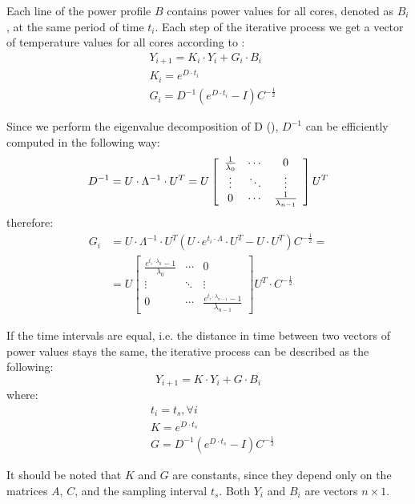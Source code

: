Each line of the power profile $B$ contains power values for all cores, denoted as $B_i$, at the same period of time $t_i$. Each step of the iterative process we get a vector of temperature values for all cores according to :
\begin{align}
  & Y_{i+1} = K_i \cdot Y_i + G_i \cdot B_i \label{eq:recurrent} \\
  & K_i = e^{D \cdot t_i} \nonumber \\
  & G_i = D^{-1}(e^{D \cdot t_i} - I) C^{-\frac{1}{2}} \nonumber
\end{align}

Since we perform the eigenvalue decomposition of D (), $D^{-1}$ can be efficiently computed in the following way:
\[
  D^{-1} = U \cdot \Lambda^{-1} \cdot U^T = U \left[
      \begin{array}{ccc}
        \frac{1}{\lambda_0} & \cdots & 0 \\
        \vdots & \ddots & \vdots \\
        0 & \cdots & \frac{1}{\lambda_{n - 1}}
      \end{array}
    \right] U^T \\
\]
therefore:
\begin{align*}
  G_i & = U \cdot \Lambda^{-1} \cdot U^T (U \cdot e^{t_i \cdot \Lambda} \cdot U^T - U \cdot U^T) C^{-\frac{1}{2}} = \\
      & = U \left[
        \begin{array}{ccc}
          \frac{e^{t_i \cdot \lambda_0} - 1}{\lambda_0} & \cdots & 0 \\
          \vdots & \ddots & \vdots \\
          0 & \cdots & \frac{e^{t_i \cdot \lambda_{n - 1}} - 1}{\lambda_{n - 1}}
        \end{array}
      \right] U^T \cdot C^{-\frac{1}{2}}
\end{align*}

If the time intervals are equal, i.e. the distance in time between two vectors of power values stays the same, the iterative process can be described as the following:
\[
  Y_{i+1} = K \cdot Y_i + G \cdot B_i
\]
where:
\begin{align*}
  & t_i = t_s, \forall i \\
  & K = e^{D \cdot t_s} \\
  & G = D^{-1}(e^{D \cdot t_s}-I) C^{-\frac{1}{2}}
\end{align*}

It should be noted that $K$ and $G$ are constants, since they depend only on the matrices $A$, $C$, and the sampling interval $t_s$.  Both $Y_i$ and $B_i$ are vectors $n \times 1$.

